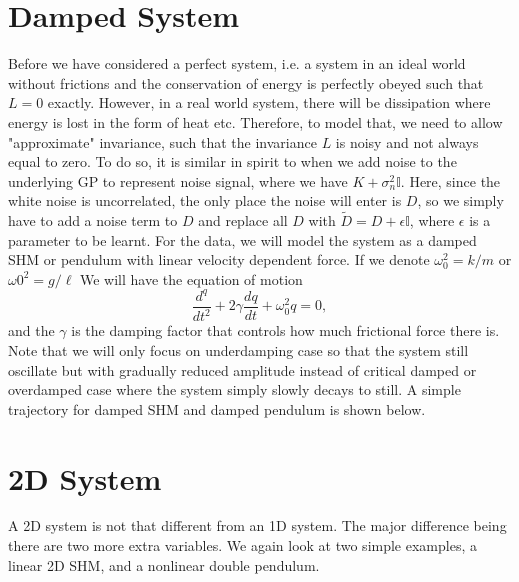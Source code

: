 \documentclass{statsmsc}
\begin{document}
\section{Damped System}
Before we have considered a perfect system, i.e. a system in an ideal world without frictions and the conservation of energy is perfectly obeyed such that $L=0$ exactly.
However, in a real world system, there will be dissipation where energy is lost in the form of heat etc.  
Therefore, to model that, we need to allow "approximate" invariance, such that the invariance $L$ is noisy and not always equal to zero. 
To do so, it is similar in spirit to when we add noise to the underlying GP to represent noise signal, where we have $K+\sigma_n^2 \mathbb{I}$.
Here, since the white noise is uncorrelated, the only place the noise will enter is $D$, so we simply have to add a noise term to $D$ and replace all $D$ with $\tilde{D}=D+\epsilon \mathbb{I}$, where $\epsilon$ is a parameter to be learnt. 
For the data, we will model the system as a damped SHM or pendulum with linear velocity dependent force.
If we denote $\omega_0^2=k/m$ or $\omega0^2=g/\ell$
We will have the equation of motion 
$$
\frac{d^q}{dt^2}+2\gamma\frac{dq}{dt}+\omega_0^2q=0,
$$
and the $\gamma$ is the damping factor that controls how much frictional force there is. 
Note that we will only focus on underdamping case so that the system still oscillate but with gradually reduced amplitude instead of critical damped or overdamped case where the system simply slowly decays to still.
A simple trajectory for damped SHM and damped pendulum is shown below.

\section{2D System}
A 2D system is not that different from an 1D system. The major difference being there are two more extra variables. 
We again look at two simple examples, a linear 2D SHM, and a nonlinear double pendulum.
\end{document}
